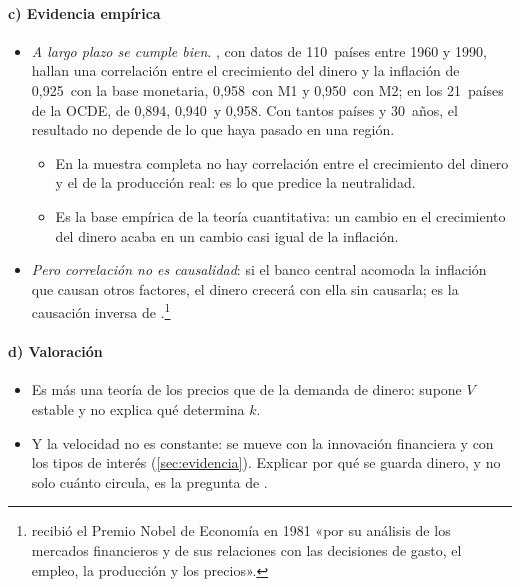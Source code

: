\documentclass[11pt]{article}
\begin{document}
\paragraph{c) Evidencia empírica}

\begin{itemize}
\item \emph{A largo plazo se cumple bien}. \textcite{McCandlessWeber1995}, con datos de 110~países entre 1960 y 1990, hallan una correlación entre el crecimiento del dinero y la inflación de 0,925~con la base monetaria, 0,958~con M1 y 0,950~con M2; en los 21~países de la OCDE, de 0,894, 0,940~y 0,958. Con tantos países y 30~años, el resultado no depende de lo que haya pasado en una región.
  \begin{itemize}
  \item En la muestra completa no hay correlación entre el crecimiento del dinero y el de la producción real: es lo que predice la neutralidad.
  \item Es la base empírica de la teoría cuantitativa: un cambio en el crecimiento del dinero acaba en un cambio casi igual de la inflación.
  \end{itemize}
\item \emph{Pero correlación no es causalidad}: si el banco central acomoda la inflación que causan otros factores, el dinero crecerá con ella sin causarla\nocite{Walsh2017Monetary}; es la causación inversa de \textcite{Tobin1970Money} .\footnote{ recibió el Premio Nobel de Economía en 1981 «por su análisis de los mercados financieros y de sus relaciones con las decisiones de gasto, el empleo, la producción y los precios»\nocite{Nobel1981Tobin}.}
\end{itemize}

\paragraph{d) Valoración}

\begin{itemize}
\item Es más una teoría de los precios que de la demanda de dinero: supone $V$ estable y no explica qué determina $k$.
\item Y la velocidad no es constante: se mueve con la innovación financiera y con los tipos de interés (\ref{sec:evidencia}). Explicar por qué se guarda dinero, y no solo cuánto circula, es la pregunta de .
\end{itemize}
\end{document}
